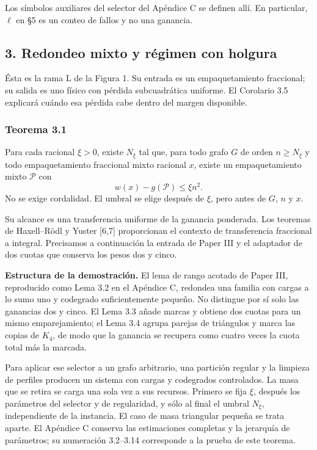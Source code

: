 \documentclass[spanish,11pt,a4paper]{article}
\begin{document}
Los símbolos auxiliares del selector del Apéndice C se definen allí. En particular, \(\ell\) en §5 es un conteo de fallos y no una ganancia.

\subsection{3. Redondeo mixto y régimen con holgura}\label{redondeo-mixto-y-regimen-con-holgura}

Ésta es la rama L de la Figura 1. Su entrada es un empaquetamiento fraccional; su salida es uno físico con pérdida subcuadrática uniforme. El Corolario 3.5 explicará cuándo esa pérdida cabe dentro del margen disponible.

\subsubsection{Teorema 3.1}\label{teorema-3.1}

Para cada racional \(\xi>0\), existe \(N_\xi\) tal que, para todo grafo \(G\) de orden \(n\ge N_\xi\) y todo empaquetamiento fraccional mixto racional \(x\), existe un empaquetamiento mixto \(\mathcal P\) con \[
w(x)-g(\mathcal P)\le\xi n^2.
\tag{3.1}
\] No se exige cordalidad. El umbral se elige después de \(\xi\), pero antes de \(G\), \(n\) y \(x\).

Su alcance es una transferencia uniforme de la ganancia ponderada. Los teoremas de Haxell--Rödl y Yuster {[}6,7{]} proporcionan el contexto de transferencia fraccional a integral. Precisamos a continuación la entrada de Paper III y el adaptador de dos cuotas que conserva los pesos dos y cinco.

\textbf{Estructura de la demostración.} El lema de rango acotado de Paper III, reproducido como Lema 3.2 en el Apéndice C, redondea una familia con cargas a lo sumo uno y codegrado suficientemente pequeño. No distingue por sí solo las ganancias dos y cinco. El Lema 3.3 añade marcas y obtiene dos cuotas para un mismo emparejamiento; el Lema 3.4 agrupa parejas de triángulos y marca las copias de \(K_4\), de modo que la ganancia se recupera como cuatro veces la cuota total más la marcada.

Para aplicar ese selector a un grafo arbitrario, una partición regular y la limpieza de perfiles producen un sistema con cargas y codegrados controlados. La masa que se retira se carga una sola vez a sus recursos. Primero se fija \(\xi\), después los parámetros del selector y de regularidad, y sólo al final el umbral \(N_\xi\), independiente de la instancia. El caso de masa triangular pequeña se trata aparte. El Apéndice C conserva las estimaciones completas y la jerarquía de parámetros; su numeración 3.2--3.14 corresponde a la prueba de este teorema.
\end{document}
